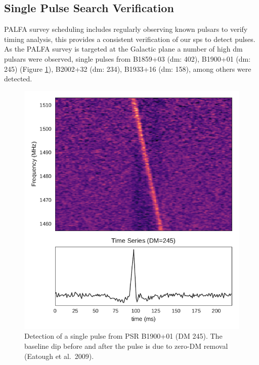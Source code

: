\documentclass[a4paper,fleqn,usenatbib]{mnras}
\begin{document}

\subsection{Single Pulse Search Verification}
\label{sec:system_verify}

PALFA survey scheduling includes regularly observing known pulsars to verify
timing analysis, this provides a consistent verification of our \gls{sps} to
detect pulses. As the PALFA survey is targeted at the Galactic plane a number of
high \gls{dm} pulsars were observed, single pulses from B1859+03 (\gls{dm}:
402), B1900+01 (\gls{dm}: 245) (Figure \ref{fig:B1900}), B2002+32 (\gls{dm}:
234), B1933+16 (\gls{dm}: 158), among others were detected.


\begin{figure}
    \includegraphics[width=1.0\linewidth]{figures/B1900_01.pdf}
    \caption{Detection of a single pulse from PSR B1900+01 (DM 245). The
    baseline dip before and after the pulse is due to zero-DM removal (Eatough
    et al.~2009). }
    \label{fig:B1900}
\end{figure}
\end{document}
